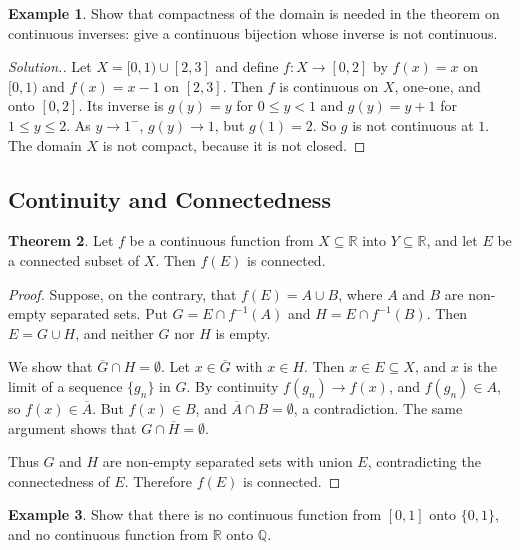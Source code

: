 \documentclass[11pt,a4paper]{article}
\numberwithin{equation}{section}
\theoremstyle{definition}
\newtheorem{thm}{Theorem}[subsection]
\newtheorem{exa}[thm]{Example}
\newenvironment{solution}
  {\renewcommand{\qedsymbol}{}\begin{proof}[\textit{Solution}.]}
  {\end{proof}}
\begin{document}
\begin{exa}
Show that compactness of the domain is needed in the theorem on continuous inverses: give a continuous bijection whose inverse is not continuous.
\end{exa}

\begin{solution}
Let $X = [0,1)\cup[2,3]$ and define $f: X\longrightarrow[0,2]$ by $f(x) = x$ on $[0,1)$ and $f(x) = x-1$ on $[2,3]$. Then $f$ is continuous on $X$, one-one, and onto $[0,2]$. Its inverse is $g(y) = y$ for $0\leq y<1$ and $g(y) = y+1$ for $1\leq y\leq 2$. As $y\longrightarrow 1^-$, $g(y)\longrightarrow 1$, but $g(1) = 2$. So $g$ is not continuous at $1$. The domain $X$ is not compact, because it is not closed.
\end{solution}


\subsection{Continuity and Connectedness}

\begin{thm}
Let $f$ be a continuous function from $X\subseteq \mathbb{R}$ into $Y\subseteq \mathbb{R}$, and let $E$ be a connected subset of $X$. Then $f(E)$ is connected.
\end{thm}

\begin{proof}
Suppose, on the contrary, that $f(E)  = A\cup B$, where $A$ and $B$ are non-empty separated sets. Put $G  = E \cap f^{-1}(A)$ and $H = E\cap f^{-1}(B)$. Then $E = G \cup H$, and neither $G$ nor $H$ is empty.

We show that $\overline{G}\cap H = \emptyset$. Let $x\in\overline{G}$ with $x\in H$. Then $x\in E\subseteq X$, and $x$ is the limit of a sequence $\{g_n\}$ in $G$. By continuity $f(g_n)\longrightarrow f(x)$, and $f(g_n)\in A$, so $f(x)\in\overline{A}$. But $f(x)\in B$, and $\overline{A}\cap B = \emptyset$, a contradiction. The same argument shows that $G\cap\overline{H} = \emptyset$.

Thus $G$ and $H$ are non-empty separated sets with union $E$, contradicting the connectedness of $E$. Therefore $f(E)$ is connected.
\end{proof}

\begin{exa}
Show that there is no continuous function from $[0,1]$ onto $\{0,1\}$, and no continuous function from $\mathbb{R}$ onto $\mathbb{Q}$.
\end{exa}
\end{document}
